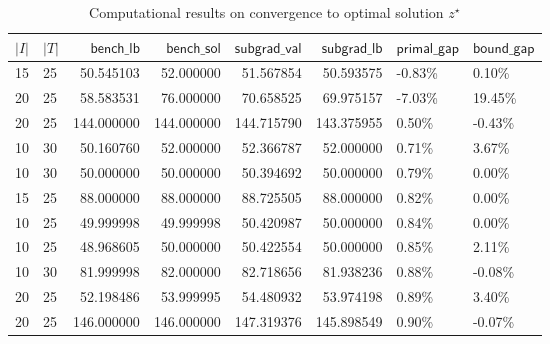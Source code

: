 \documentclass[
  a4paper,
,tablecaptionabove
]{scrartcl}
\numberwithin{equation}{section}
\begin{document}
\begin{table}
  \caption{Computational results on convergence to optimal solution $z^\star$} \label{tab:sgsconv}
  \begin{tabular}{|l|l|r|r|r|r|l|l|}
    \toprule
    $|I|$ & $|T|$ & $\mathsf{bench\_lb}$ & $\mathsf{bench\_sol}$ & $\mathsf {subgrad\_val}$ & $\mathsf{subgrad\_lb}$ & $\mathsf{primal\_gap}$ & $\mathsf{bound\_gap}$ \\
    \midrule
    15    & 25    & 50.545103            & 52.000000             & 51.567854                & 50.593575              & -0.83\%                & 0.10\%                \\
    20    & 25    & 58.583531            & 76.000000             & 70.658525                & 69.975157              & -7.03\%                & 19.45\%               \\
    20    & 25    & 144.000000           & 144.000000            & 144.715790               & 143.375955             & 0.50\%                 & -0.43\%               \\
    10    & 30    & 50.160760            & 52.000000             & 52.366787                & 52.000000              & 0.71\%                 & 3.67\%                \\
    10    & 30    & 50.000000            & 50.000000             & 50.394692                & 50.000000              & 0.79\%                 & 0.00\%                \\
    15    & 25    & 88.000000            & 88.000000             & 88.725505                & 88.000000              & 0.82\%                 & 0.00\%                \\
    10    & 25    & 49.999998            & 49.999998             & 50.420987                & 50.000000              & 0.84\%                 & 0.00\%                \\
    10    & 25    & 48.968605            & 50.000000             & 50.422554                & 50.000000              & 0.85\%                 & 2.11\%                \\
    10    & 30    & 81.999998            & 82.000000             & 82.718656                & 81.938236              & 0.88\%                 & -0.08\%               \\
    20    & 25    & 52.198486            & 53.999995             & 54.480932                & 53.974198              & 0.89\%                 & 3.40\%                \\
    20    & 25    & 146.000000           & 146.000000            & 147.319376               & 145.898549             & 0.90\%                 & -0.07\%               \\

\end{tabular}
\end{table}
\end{document}
